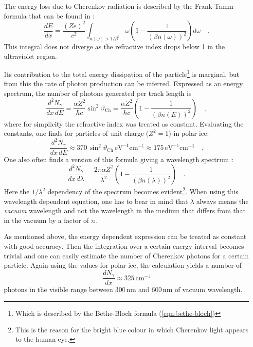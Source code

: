 The energy loss due to Cherenkov radiation is described by the Frank-Tamm 
formula that can be found in \cite{Jackson}:
\begin{equation}
  \frac{dE}{dx} = \frac{(Z e)^2}{c^2} \int_{n(\omega)>1/\beta^2} \omega 
    \left( 1 - \frac{1}{(\beta n(\omega))^2} \right) d\omega \quad.
\end{equation}
This integral does not diverge as the refractive index drops below 1 in the 
ultraviolet region.

Its contribution to the total energy dissipation of the particle\footnote{Which 
is described by the Bethe-Bloch formula (\ref{eqn:bethe-bloch})} is marginal, 
but from this the rate of photon production can be inferred. Expressed as an 
energy spectrum, the number of photons generated per track length is
\cite{PDG}
\begin{equation}
  \frac{d^2 N_{\gamma}}{dx\,dE} 
    = \frac{\alpha Z^2}{\hbar c} \sin^2 \vartheta_{\mathrm{Ch}}
    = \frac{\alpha Z^2}{\hbar c} \left(1-\frac{1}{(\beta n(E))^2}\right) \quad,
\end{equation}
where for simplicity the refractive index was treated as constant. Evaluating 
the constants, one finds for particles of unit charge ($Z^2 = 1$) in polar ice:
\begin{equation}
  \frac{d^2 N_{\gamma}}{dx\,dE} 
    \approx 370\,\sin^2\vartheta_{\mathrm{Ch}}\,\mathrm{eV}^{-1}\mathrm{cm}^{-1}
    \approx 175 \,\mathrm{eV}^{-1}\mathrm{cm}^{-1} \quad.
\end{equation}
One also often finds a version of this formula giving a wavelength spectrum 
\cite{PDG}:
\begin{equation}
  \frac{d^2 N_{\gamma}}{dx\,d\lambda} = \frac{2\pi\alpha Z^2}{\lambda^2}
    \left(1-\frac{1}{(\beta n(\lambda))^2}\right) \quad.
  \label{eqn:FrankTammWvl}
\end{equation}
Here the $1/\lambda^2$ dependency of the spectrum becomes evident\footnote{This 
is the reason for the bright blue colour in which Cherenkov light appears to 
the human eye.}. When using this wavelength dependent equation, one has to bear 
in mind that $\lambda$ always means the \emph{vacuum} wavelength and not the 
wavelength in the medium that differs from that in the vacuum by a factor of 
$n$.

As mentioned above, the energy dependent expression can be treated as constant 
with good accuracy. Then the integration over a certain energy interval becomes 
trivial and one can easily estimate the number of Cherenkov photons for a
certain particle. Again using the values for polar ice, the calculation yields a 
number of
\begin{equation}
  \frac{dN_{\gamma}}{dx} \approx 325 \,\mathrm{cm}^{-1}
  \label{eqn:Chkov_Nphot_per_track_length}
\end{equation}
photons in the visible range between 300\,nm and 600\,nm of vacuum wavelength. 
